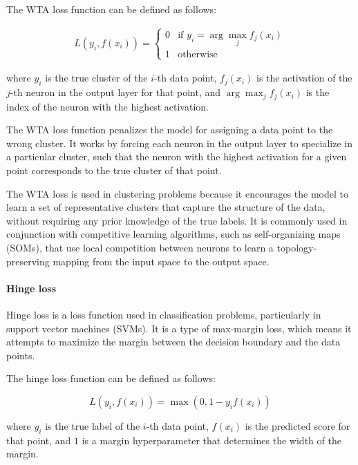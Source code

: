 The WTA loss function can be defined as follows:

\begin{equation}
\begin{split}
	L(y_i, f(x_i)) = \begin{cases}
		0 & \text{if } y_i = \arg\max_j f_j(x_i) \\
		1 & \text{otherwise} \
	\end{cases}
\end{split}
\end{equation}

where $y_i$ is the true cluster of the $i$-th data point, $f_j(x_i)$ is the activation of the $j$-th neuron in the output layer for that point, and $\arg\max_j f_j(x_i)$ is the index of the neuron with the highest activation.

The WTA loss function penalizes the model for assigning a data point to the wrong cluster. It works by forcing each neuron in the output layer to specialize in a particular cluster, such that the neuron with the highest activation for a given point corresponds to the true cluster of that point.

The WTA loss is used in clustering problems because it encourages the model to learn a set of representative clusters that capture the structure of the data, without requiring any prior knowledge of the true labels. It is commonly used in conjunction with competitive learning algorithms, such as self-organizing maps (SOMs), that use local competition between neurons to learn a topology-preserving mapping from the input space to the output space.

\paragraph{Hinge loss}
\label{par:3_hinge_loss}

Hinge loss is a loss function used in classification problems, particularly in support vector machines (SVMs). It is a type of max-margin loss, which means it attempts to maximize the margin between the decision boundary and the data points.

The hinge loss function can be defined as follows:

\begin{equation}
	L(y_i, f(x_i)) = \max(0, 1 - y_i f(x_i))
\end{equation}

where $y_i$ is the true label of the $i$-th data point, $f(x_i)$ is the predicted score for that point, and $1$ is a margin hyperparameter that determines the width of the margin.

